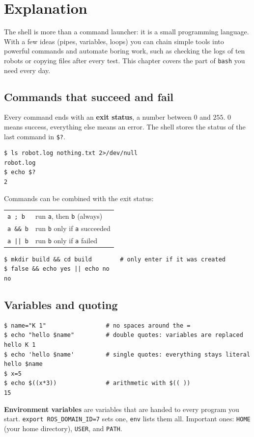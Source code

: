\label{ch:linux2}

\section*{Explanation}
The shell is more than a command launcher: it is a small programming language. With a few ideas (pipes, variables, loops) you can chain simple tools into powerful commands and automate boring work, such as checking the logs of ten robots or copying files after every test. This chapter covers the part of \texttt{bash} you need every day.

\subsection*{Commands that succeed and fail}
Every command ends with an \textbf{exit status}, a number between $0$ and $255$. $0$ means success, everything else means an error. The shell stores the status of the last command in \texttt{\$?}.
\begin{verbatim}
$ ls robot.log nothing.txt 2>/dev/null
robot.log
$ echo $?
2
\end{verbatim}
Commands can be combined with the exit status:
\begin{center}
\renewcommand{\arraystretch}{1.2}
\begin{tabular}{ll}
\verb|a ; b| & run \texttt{a}, then \texttt{b} (always)\\
\verb|a && b| & run \texttt{b} only if \texttt{a} succeeded\\
\verb/a || b/ & run \texttt{b} only if \texttt{a} failed\\
\end{tabular}
\end{center}
\begin{verbatim}
$ mkdir build && cd build        # only enter if it was created
$ false && echo yes || echo no
no
\end{verbatim}

\subsection*{Variables and quoting}
\begin{verbatim}
$ name="K 1"                 # no spaces around the =
$ echo "hello $name"         # double quotes: variables are replaced
hello K 1
$ echo 'hello $name'         # single quotes: everything stays literal
hello $name
$ x=5
$ echo $((x*3))              # arithmetic with $(( ))
15
\end{verbatim}
\textbf{Environment variables} are variables that are handed to every program you start. \verb|export ROS_DOMAIN_ID=7| sets one, \verb|env| lists them all. Important ones: \texttt{HOME} (your home directory), \texttt{USER}, and \texttt{PATH}.

